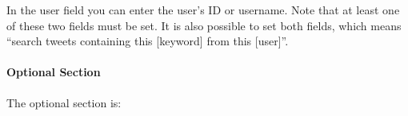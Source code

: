 \documentclass[letterpaper,10pt,english]{sphinxmanual}
\begin{document}
\sphinxAtStartPar
In the user field you can enter the user’s ID or username.
Note that at least one of these two fields must be set.
It is also possible to set both fields, which means “search
tweets containing this {[}keyword{]} from this {[}user{]}”.


\paragraph{Optional Section}
\label{\detokenize{guide/tweet_search_guide:optional-section}}
\sphinxAtStartPar
The optional section is:

\begin{sphinxVerbatim}[commandchars=\\\{\}]

      


\end{sphinxVerbatim}
\end{document}
